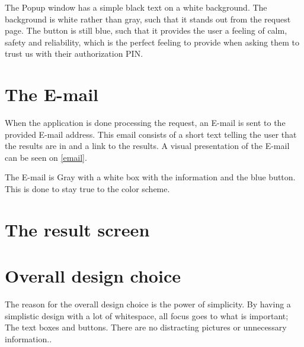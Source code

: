 
The Popup window has a simple black text on a white background. The background
is white rather than gray, such that it stands out from the request page. The
button is still blue, such that it provides the user a feeling of calm, safety
and reliability, which is the perfect feeling to provide when asking them to
trust us with their authorization PIN\citep[p. 61]{WebUI}.

\section{The E-mail}
When the application is done processing the request, an E-mail is sent to the
provided E-mail address. This email consists of a short text telling the user
that the results are in and a link to the results. A visual presentation of the
E-mail can be seen on \autoref{email}.


The E-mail is Gray with a white box with the information and the blue button.
This is done to stay true to the color scheme.

\section{The result screen}

\section{Overall design choice}
The reason for the overall design choice is the power of simplicity. By having a
simplistic design with a lot of whitespace, all focus goes to what is
important; The text boxes and buttons. There are no distracting
pictures or unnecessary information.\citep[p. 26 \& 32]{WebUI}.\\




